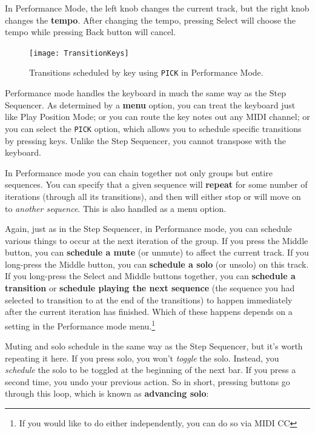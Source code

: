 \documentclass{article}
\begin{document}
In Performance Mode, the left knob changes the current track, but the right knob changes the {\bf tempo}.  After changing the tempo, pressing Select will choose the tempo while pressing Back button will cancel.  

\begin{figure}
\vspace{-0.5em}
\hspace{\fill}\texttt{[image: TransitionKeys]}
\vspace{-1em}
\caption{\small Transitions scheduled by key using {\tt PICK} in Performance Mode.}
\vspace{-1em}
\label{transitionkeys}
\end{figure}

Performance mode handles the keyboard in much the same way as the Step Sequencer.  As determined by a {\bf menu} option, you can treat the keyboard just like Play Position Mode; or you can route the key notes out any MIDI channel; or you can select the {\tt PICK} option, which allows you to schedule specific transitions by pressing keys.  Unlike the Step Sequencer, you cannot transpose with the keyboard.

In Performance mode you can chain together not only groups but entire sequences.  You can specify that a given sequence will {\bf repeat} for some number of iterations (through all its transitions), and then will either stop or will move on to {\it another sequence}.  This is also handled as a menu option.

Again, just as in the Step Sequencer, in Performance mode, you can schedule various things to occur at the next iteration of the group.  If you press the Middle button, you can {\bf schedule a mute} (or unmute) to affect the current track.  If you long-press the Middle button, you can {\bf schedule a solo} (or unsolo) on this track.  If you long-press the Select and Middle buttons together, you can {\bf schedule a transition} or {\bf schedule playing the next sequence} (the sequence you had selected to transition to at the end of the transitions) to happen immediately after the current iteration has finished.  Which of these happens depends on a setting in the Performance mode menu.\footnote{If you would like to do either independently, you can do so via MIDI CC}

Muting and solo schedule in the same way as the Step Sequencer, but it's worth repeating it here. If you press solo, you won't {\it toggle} the solo.  Instead, you {\it schedule} the solo to be toggled at the beginning of the next bar.  If you press a second time, you undo your previous action.  So in short, pressing buttons go through this loop, which is known as {\bf advancing solo}:
\end{document}
